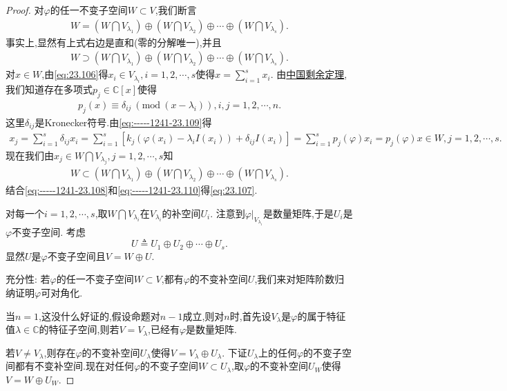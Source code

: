 \documentclass[../../main.tex]{subfiles}%
\begin{document}
\begin{proof}
对$\varphi$的任一不变子空间$W \subset V$,我们断言
\begin{align}
W = (W \bigcap V_{\lambda_1}) \oplus (W \bigcap V_{\lambda_2}) \oplus \cdots \oplus (W \bigcap V_{\lambda_s}). \label{eq:23.107}
\end{align}
事实上,显然有上式右边是直和(零的分解唯一),并且
\begin{align}
W \supset (W \bigcap V_{\lambda_1}) \oplus (W \bigcap V_{\lambda_2}) \oplus \cdots \oplus (W \bigcap V_{\lambda_s}). \label{eq:-----1241-23.108}
\end{align}
对$x \in W$,由\eqref{eq:23.106}得$x_i \in V_{\lambda_i}, i = 1,2,\cdots,s$使得$x = \sum_{i=1}^s x_i$. 由\hyperref[theorem:中国剩余定理(多项式版)]{中国剩余定理},我们知道存在多项式$p_j \in \mathbb{C}[x]$使得
\begin{align}
p_j(x) \equiv \delta_{ij} \ (\text{mod} \ (x - \lambda_i)), i,j = 1,2,\cdots,n. \label{eq:-----1241-23.109}
\end{align}
这里$\delta_{ij}$是Kronecker符号.由\eqref{eq:-----1241-23.109}得
\begin{align*}
x_j=\sum_{i=1}^s{\delta _{ij}x_i}=\sum_{i=1}^s{\left[ k_j\left( \varphi \left( x_i \right) -\lambda _iI\left( x_i \right) \right) +\delta _{ij}I\left( x_i \right) \right]}=\sum_{i=1}^s{p_j(\varphi )x_i}=p_j(\varphi )x\in W,j=1,2,\cdots ,s.
\end{align*}
现在我们由$x_j \in W \bigcap V_{\lambda_j}, j = 1,2,\cdots,s$知
\begin{align}
W \subset (W \bigcap V_{\lambda_1}) \oplus (W \bigcap V_{\lambda_2}) \oplus \cdots \oplus (W \bigcap V_{\lambda_s}). \label{eq:-----1241-23.110}
\end{align}
结合\eqref{eq:-----1241-23.108}和\eqref{eq:-----1241-23.110}得\eqref{eq:23.107}.

对每一个$i = 1,2,\cdots,s$,取$W \bigcap V_{\lambda_i}$在$V_{\lambda_i}$的补空间$U_i$. 注意到$\varphi|_{V_{\lambda_i}}$是数量矩阵,于是$U_i$是$\varphi$不变子空间. 考虑
$$U \triangleq U_1 \oplus U_2 \oplus \cdots \oplus U_s.$$
显然$U$是$\varphi$不变子空间且$V = W \oplus U$.

{\heiti 充分性:}
若$\varphi$的任一不变子空间$W \subset V$,都有$\varphi$的不变补空间$U$,我们来对矩阵阶数归纳证明$\varphi$可对角化.

当$n = 1$,这没什么好证的,假设命题对$n - 1$成立,则对$n$时,首先设$V_\lambda$是$\varphi$的属于特征值$\lambda \in \mathbb{C}$的特征子空间,则若$V = V_\lambda$,已经有$\varphi$是数量矩阵.

若$V \neq V_\lambda$,则存在$\varphi$的不变补空间$U_\lambda$使得$V = V_\lambda \oplus U_\lambda$. 下证$U_\lambda$上的任何$\varphi$的不变子空间都有不变补空间.现在对任何$\varphi$的不变子空间$W \subset U_\lambda$,取$\varphi$的不变补空间$U_W$使得$V = W \oplus U_W$.


\end{proof}
\end{document}
